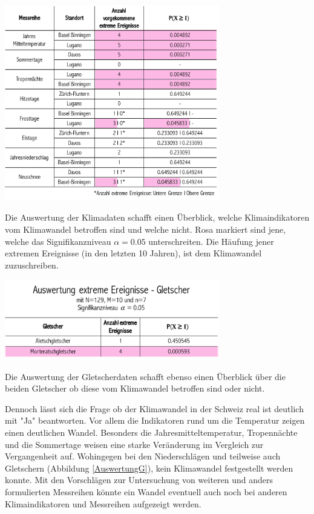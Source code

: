 \begin{refsection}
\begin{table}
\centering
\includegraphics[width=0.7\textwidth]{extrem/AuswertungK.pdf}
\caption{Die Auswertung der Klimadaten schafft einen Überblick, welche Klimaindikatoren vom Klimawandel betroffen sind und welche nicht. Rosa markiert sind jene, welche das Signifikanzniveau $\alpha=0.05$ unterschreiten. Die Häufung jener extremen Ereignisse (in den letzten 10 Jahren), ist dem Klimawandel zuzuschreiben.}
\label{AuswertungK}
\end{table}


\begin{table}
\centering
\includegraphics[width=0.7\textwidth]{extrem/AuswertungG.pdf}
\caption{Die Auswertung der Gletscherdaten schafft ebenso einen Überblick über die beiden Gletscher ob diese vom Klimawandel betroffen sind oder nicht.}
\label{AuswertungG}
\end{table}

Dennoch lässt sich die Frage ob der Klimawandel in der Schweiz real ist deutlich mit "Ja" beantworten. Vor allem die Indikatoren rund um die Temperatur zeigen einen deutlichen Wandel. Besonders die Jahresmitteltemperatur, Tropennächte und die Sommertage weisen eine starke Veränderung im Vergleich zur Vergangenheit auf. Wohingegen bei den Niederschlägen und teilweise auch Gletschern (Abbildung \ref{AuswertungG}), kein Klimawandel festgestellt werden konnte. Mit den Vorschlägen zur Untersuchung von weiteren und anders formulierten Messreihen könnte ein Wandel eventuell auch noch bei anderen Klimaindikatoren und Messreihen aufgezeigt werden.


\end{refsection}
